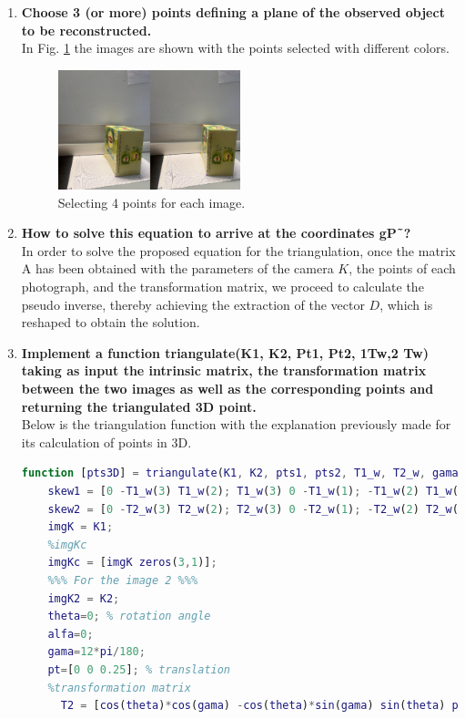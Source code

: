 \documentclass[12pt, twoside]{report}
\begin{document}
\begin{enumerate}
\item \textbf{Choose 3 (or more) points defining a plane of the observed object to be reconstructed.}\\
In Fig. \ref{fig:fig1_sel} the images are shown with the points selected with different colors.
\begin{figure}[H]
    \centering
    \includegraphics[width=0.5\textwidth]{images/tp_3/4pointsselected.png}
    \caption{Selecting 4 points for each image.}
    \label{fig:fig1_sel}
\end{figure}
\item \textbf{How to solve this equation to arrive at the coordinates gP˜?}\\
In order to solve the proposed equation for the triangulation, once the matrix A has been obtained with the parameters of the camera $K$, the points of each photograph, and the transformation matrix, we proceed to calculate the pseudo inverse, thereby achieving the extraction of the vector $D$, which is reshaped to obtain the solution.
\item \textbf{Implement a function triangulate(K1, K2, Pt1, Pt2, 1Tw,2 Tw) taking as input the intrinsic matrix, the transformation matrix between the two images as well as the corresponding points and
returning the triangulated 3D point.}\\
Below is the triangulation function with the explanation previously made for its calculation of points in 3D.
\begin{lstlisting}[language=Matlab, numbers=none]
    function [pts3D] = triangulate(K1, K2, pts1, pts2, T1_w, T2_w, gama)
    skew1 = [0 -T1_w(3) T1_w(2); T1_w(3) 0 -T1_w(1); -T1_w(2) T1_w(1) 0];
    skew2 = [0 -T2_w(3) T2_w(2); T2_w(3) 0 -T2_w(1); -T2_w(2) T2_w(1) 0];
    imgK = K1;
    %imgKc  
    imgKc = [imgK zeros(3,1)];
    %%% For the image 2 %%%
    imgK2 = K2;
    theta=0; % rotation angle
    alfa=0;
    gama=12*pi/180;
    pt=[0 0 0.25]; % translation
    %transformation matrix 
      T2 = [cos(theta)*cos(gama) -cos(theta)*sin(gama) sin(theta) pt(1); sin(alfa)*sin(theta)*cos(gama)+cos(alfa)*sin(gama) -sin(alfa)*sin(theta)*sin(gama)+cos(alfa)*cos(gama) -sin(alfa)*cos(theta) pt(2); -cos(alfa)*sin(theta)*cos(gama)+sin(alfa)*sin(gama) cos(alfa)*sin(theta)*sin(gama)+sin(alfa)*cos(gama) cos(alfa)*cos(theta) pt(3); 0 0 0 1];

\end{lstlisting}
\end{enumerate}
\end{document}
